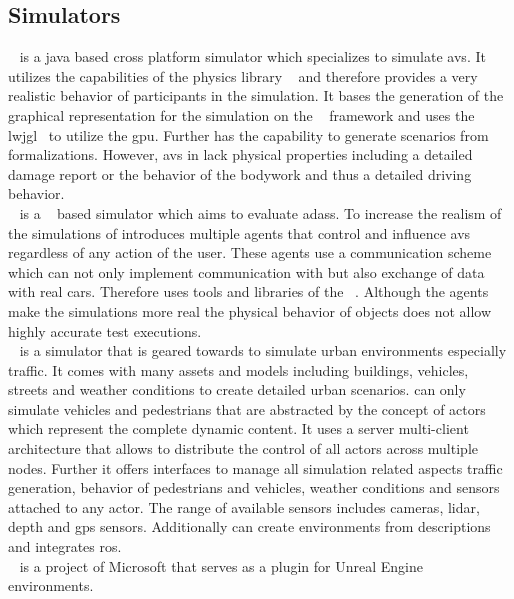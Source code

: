 \subsection{Simulators}
\opends{}~\cite{opends} is a java based cross platform simulator which specializes to simulate \glspl{av}.
It utilizes the capabilities of the physics library \jbullet{}~\cite{jBullet} and therefore provides a very realistic behavior of participants in the simulation.
It bases the generation of the graphical representation for the simulation on the \jmonkey{}~\cite{jmonkey} framework and uses the \gls{lwjgl}~\cite{lwjgl} to utilize the \gls{gpu}.
Further \opends{} has the capability to generate scenarios from \opendrive{} formalizations.
However, \glspl{av} in \opends{} lack physical properties including a detailed damage report or the behavior of the bodywork and thus a detailed driving behavior.\\
\simulAII{}~\cite{simulA2} is a \webots{}~\cite{webots} based simulator which aims to evaluate \glspl{adas}.
To increase the realism of the simulations of \webots{} \simulAII{} introduces multiple agents that control and influence \glspl{av} regardless of any action of the user.
These agents use a communication scheme which can not only implement communication with \webots{} but also exchange of data with real cars.
Therefore \simulAII{} uses tools and libraries of the \ros{}~\cite{rosProject}.
Although the agents make the simulations more real the physical behavior of objects does not allow highly accurate test executions.\\
\carla{}~\cite{carla} is a simulator that is geared towards to simulate urban environments especially traffic.
It comes with many assets and models including buildings, vehicles, streets and weather conditions to create detailed urban scenarios.
\carla{} can only simulate vehicles and pedestrians that are abstracted by the concept of actors which represent the complete dynamic content.
It uses a server multi-client architecture that allows to distribute the control of all actors across multiple nodes.
Further it offers interfaces to manage all simulation related aspects \eg{} traffic generation, behavior of pedestrians and vehicles, weather conditions and sensors attached to any actor.
The range of available sensors includes cameras, \gls{lidar}, depth and \gls{gps} sensors.
Additionally \carla{} can create environments from \opendrive{} descriptions and integrates \gls{ros}.\\
\airsim{}~\cite{airsim} is a project of Microsoft that serves as a plugin for Unreal Engine~\cite{unrealEngine} environments.
